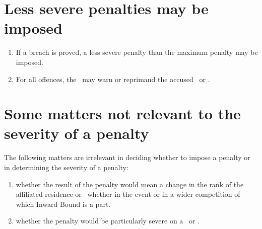 \documentclass[12pt]{report}
\begin{document}
  \section{Less severe penalties may be imposed}
  \begin{enumerate}
    \item If a breach is proved, a less severe penalty than the maximum penalty may be imposed.
    \item For all offences, the \Referee\ may warn or reprimand the accused \Captain\ or \President.
  \end{enumerate}
  \section{Some matters not relevant to the severity of a penalty}
  \begin{fenumerate}
    \item The following matters are irrelevant in deciding whether to impose a penalty or in determining the severity of a penalty:
    \begin{enumerate}
      \item whether the result of the penalty would mean a change in the rank of the affiliated residence or \team\ whether in the event or in a wider competition of which Inward Bound is a part.
      \item whether the penalty would be particularly severe on a \Coach\ or \President.
    \end{enumerate}
  \end{fenumerate}
\end{document}
